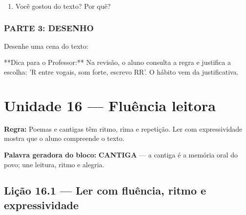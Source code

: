 \begin{exercicio}
\begin{enumerate}
  \item Você gostou do texto? Por quê?
  \begin{center}
  \underline{\hspace{12cm}}
  \end{center}

\end{enumerate}

\subsection*{PARTE 3: DESENHO}

Desenhe uma cena do texto:

\begin{center}
\end{center}

\end{exercicio}

\begin{dica}
**Dica para o Professor:** Na revisão, o aluno consulta a regra e justifica a escolha: 'R entre vogais, som forte, escrevo RR'. O hábito vem da justificativa.
\end{dica}


\chapter{Unidade 16 --- Fluência leitora}


\textbf{Regra:} Poemas e cantigas têm ritmo, rima e repetição. Ler com expressividade mostra que o aluno compreende o texto.

\textbf{Palavra geradora do bloco:} \textbf{CANTIGA} --- a cantiga é a memória oral do povo; une leitura, ritmo e alegria.

\section{Lição 16.1 --- Ler com fluência, ritmo e expressividade}


